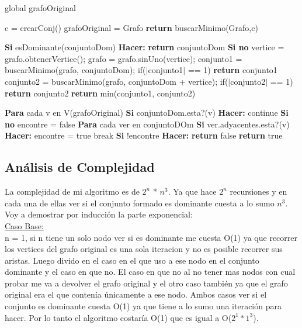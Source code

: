 global grafoOriginal

\begin{codebox}
\li	c = crearConj()
\li	grafoOriginal = Grafo
\li	\textbf{return} buscarMinimo(Grafo,c)
\end{codebox}

\begin{codebox}
\li\textbf{Si} esDominante(conjuntoDom) \textbf{Hacer:} \Do
\li		\textbf{return} conjuntoDom 
\End
\li	\textbf{Si no}  \Do
\li		vertice = grafo.obtenerVertice(); 
\li		grafo = grafo.sinUno(vertice);
\li		conjunto1 = buscarMinimo(grafo, conjuntoDom);
\li		if($|$conjunto1$|$ == 1) \textbf{return} conjunto1
\li		conjunto2 = buscarMinimo(grafo, conjuntoDom + vertice);
\li		if($|$conjunto2$|$ == 1) \textbf{return} conjunto2
\li		\textbf{return} min(conjunto1, conjunto2)	
\End

\end{codebox}

\begin{codebox}
\li \textbf{Para} cada v en V(grafoOriginal) \Do
\li \textbf{Si} conjuntoDom.esta?(v) \textbf{Hacer:} \Do
\li			continue 
		\End
\li \textbf{Si no}  \Do
\li			encontre = false
\li \textbf{Para} cada ver en conjuntoDOm \Do
\li	\textbf{Si} ver.adyacentes.esta?(v) \textbf{Hacer:} \Do	
\li			encontre = true
\li			break
			\End
	\End		
\li	\textbf{Si} !encontre \textbf{Hacer:} \Do				
\li		\textbf{return} false
			\End		
	\End
\li	\textbf{return} true
\End
\end{codebox}

\subsection{Análisis de Complejidad}

La complejidad de mi algoritmo es de $2^n$ * $n^3$. Ya que hace $2^n$ recursiones y en cada una de ellas ver si el conjunto formado es dominante cuesta a lo sumo $n^3$. Voy a demostrar por inducción la parte exponencial:\\

\underline{Caso Base:}\\

n = 1, si n tiene un solo nodo ver si es dominante me cuesta O(1) ya que recorrer los vertices del grafo original es una sola iteracion y no es posible recorrer sus aristas. Luego divido en el caso en el que uso a ese nodo en el conjunto dominante y el caso en que no. El caso en que no al no tener mas nodos con cual probar me va a devolver el grafo original y el otro caso también ya que el grafo original era el que contenía únicamente a ese nodo. Ambos casos ver si el conjunto es dominante cuesta O(1) ya que tiene a lo sumo una iteración para hacer. Por lo tanto el algoritmo costaría O(1) que es igual a O($2^1*1^3$).\\

